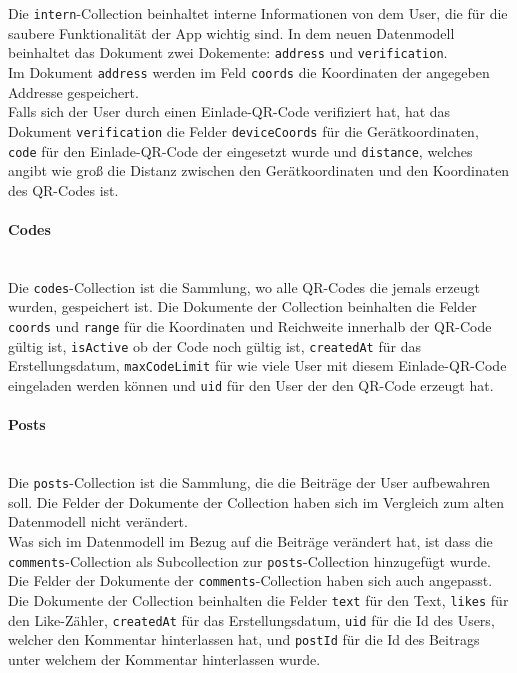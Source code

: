 \\\\
Die \texttt{intern}-Collection beinhaltet interne Informationen von dem User, die für die saubere Funktionalität der App wichtig sind. In dem neuen Datenmodell beinhaltet das Dokument zwei Dokemente: \texttt{address} und \texttt{verification}.
\\
Im Dokument \texttt{address} werden im Feld \texttt{coords} die Koordinaten der angegeben Addresse gespeichert.
\\
Falls sich der User durch einen Einlade-QR-Code verifiziert hat, hat das Dokument \texttt{verification} die Felder \texttt{deviceCoords} für die Gerätkoordinaten, \texttt{code} für den Einlade-QR-Code der eingesetzt wurde und \texttt{distance}, welches angibt wie groß die Distanz zwischen den Gerätkoordinaten und den Koordinaten des QR-Codes ist.

\paragraph{Codes}\mbox{} \\
Die \texttt{codes}-Collection ist die Sammlung, wo alle QR-Codes die jemals erzeugt wurden, gespeichert ist. Die Dokumente der Collection beinhalten die Felder \texttt{coords} und \texttt{range} für die Koordinaten und Reichweite innerhalb der QR-Code gültig ist, \texttt{isActive} ob der Code noch gültig ist, \texttt{createdAt} für das Erstellungsdatum, \texttt{maxCodeLimit} für wie viele User mit diesem Einlade-QR-Code eingeladen werden können und \texttt{uid} für den User der den QR-Code erzeugt hat.

\paragraph{Posts}\mbox{} \\
Die \texttt{posts}-Collection ist die Sammlung, die die Beiträge der User aufbewahren soll. Die Felder der Dokumente der Collection haben sich im Vergleich zum alten Datenmodell nicht verändert.
\\
Was sich im Datenmodell im Bezug auf die Beiträge verändert hat, ist dass die \texttt{comments}-Collection als Subcollection zur \texttt{posts}-Collection hinzugefügt wurde. Die Felder der Dokumente der \texttt{comments}-Collection haben sich auch angepasst. Die Dokumente der Collection beinhalten die Felder \texttt{text} für den Text, \texttt{likes} für den Like-Zähler, \texttt{createdAt} für das Erstellungsdatum, \texttt{uid} für die Id des Users, welcher den Kommentar hinterlassen hat, und \texttt{postId} für die Id des Beitrags unter welchem der Kommentar hinterlassen wurde.

